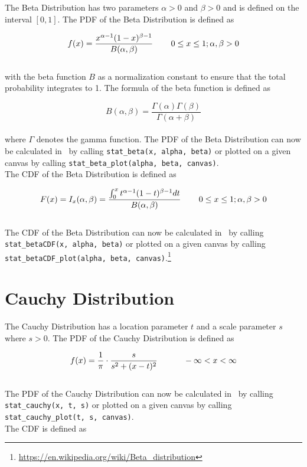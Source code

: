 		The Beta Distribution has two parameters $\alpha > 0$ and $\beta > 0$ and is defined on the interval $[0,1]$. The \ac{PDF} of the Beta Distribution is defined as

		$$f(x) = \frac{x^{\alpha-1}(1-x)^{\beta-1}}{B(\alpha,\beta)}  \hspace{.3in} 0 \le x \le 1; \alpha, \beta > 0$$
		\\[0.3cm]		
		with the beta function $B$ as a normalization constant to ensure that the total probability integrates to 1. The formula of the beta function is defined as

		$$B(\alpha,\beta) = \frac{\Gamma(\alpha)\Gamma(\beta)}{\Gamma(\alpha + \beta)}$$
		\\[0.3cm]
		where $\Gamma$ denotes the gamma function. The \ac{PDF} of the Beta Distribution can now be calculated in \setlx\ by calling \lstinline{stat_beta(x, alpha, beta)} or plotted on a given canvas by calling \lstinline{stat_beta_plot(alpha, beta, canvas)}.
		\\[0.3cm]		
		The \ac{CDF} of the Beta Distribution is defined as

		$$F(x) = I_{x}(\alpha,\beta) = \frac{\int_{0}^{x}{t^{\alpha-1}(1-t)^{\beta-1}dt}}{B(\alpha,\beta)} \hspace{.3in} 0 \le x \le 1; \alpha, \beta > 0$$
		\\[0.3cm]
		The \ac{CDF} of the Beta Distribution can now be calculated in \setlx\ by calling \lstinline{stat_betaCDF(x, alpha, beta)} or plotted on a given canvas by calling \lstinline{stat_betaCDF_plot(alpha, beta, canvas)}.\footnote{\url{https://en.wikipedia.org/wiki/Beta_distribution}}


	\section{Cauchy Distribution}

		The Cauchy Distribution has a location parameter $t$ and a scale parameter $s$ where $s > 0$. The \ac{PDF} of the Cauchy Distribution is defined as

		$$\displaystyle f(x) = \frac{1}{\pi} \cdot \frac{s}{s^2 + (x-t)^2} \quad \hspace{.3in} -\infty<x<\infty$$
		\\[0.3cm]
		The \ac{PDF} of the Cauchy Distribution can now be calculated in \setlx\ by calling \lstinline{stat_cauchy(x, t, s)} or plotted on a given canvas by calling \lstinline{stat_cauchy_plot(t, s, canvas)}.
		\\[0.3cm]
		The \ac{CDF} is defined as 

